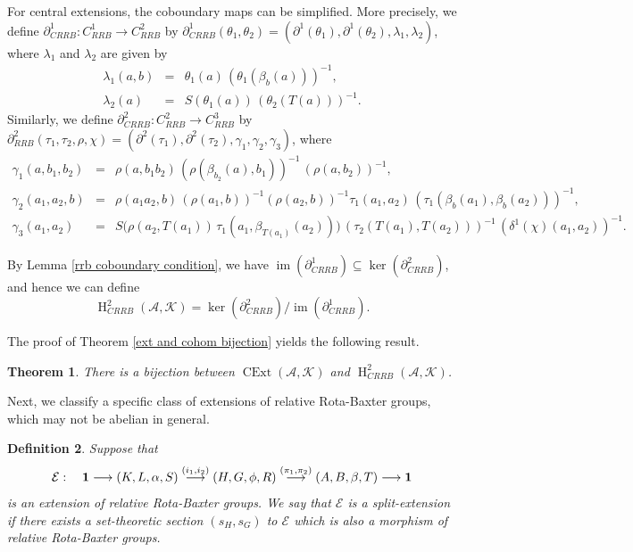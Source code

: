 \documentclass[11pt]{amsart}
\theoremstyle{thrm}
\theoremstyle{plain}
\newtheorem{thm}{Theorem}[section]
\newtheorem{defn}[thm]{Definition}
\theoremstyle{definition}
\newcommand{\Ho}{\operatorname{H} }
\newcommand{\CExt}{\operatorname{CExt} }
\newcommand{\Ker}{\operatorname{ker} }
\newcommand{\IM}{\operatorname{im} }
\numberwithin{equation}{section}
\begin{document}
For central extensions, the coboundary maps can be simplified. More precisely,  we define $\partial_{CRRB}^1: C^1_{RRB} \longrightarrow C^{2}_{RRB}$ by 
$\partial_{CRRB}^1(\theta_1, \theta_2)=(\partial^1(\theta_1), \partial^1(\theta_2), \lambda_1, \lambda_2  )$, where $\lambda_1$ and $\lambda_2$ are given by
\begin{eqnarray*}
\lambda_1(a,b) &=& \theta_1(a) \,(\theta_1(\beta_b(a)))^{-1},\\
\lambda_2(a)  &=& S(\theta_1(a)) \,(\theta_2(T(a)))^{-1}.
\end{eqnarray*}
Similarly, we define $\partial_{CRRB}^2: C^2_{RRB} \longrightarrow C^{3}_{RRB}$  by  $\partial^2_{RRB}(\tau_1, \tau_2, \rho, \chi)=(\partial^2(\tau_1), \partial^2(\tau_2), \gamma_1, \gamma_2, \gamma_3)$, where
\begin{eqnarray*}
\gamma_1(a,b_1, b_2) &=& \rho(a, b_1 b_2)  \,  (\rho(\beta_{b_2}(a), b_1))^{-1} \,(\rho(a,b_2))^{-1},\\
\gamma_2(a_1, a_2,b) &=& \rho(a_1 a_2, b) \,(\rho(a_1,b))^{-1}(\rho(a_2, b))^{-1} \tau_1(a_1, a_2) \, (\tau_1(\beta_{b}(a_1), \beta_{b}(a_2)))^{-1}, \\
\gamma_3(a_1, a_2) &=&  S\big(\rho(a_2, T(a_1)) \,\tau_1(a_1,\beta_{T(a_1)}(a_2)) \big) \, (\tau_2(T(a_1), T(a_2)))^{-1} \,(\delta^1(\chi)(a_1, a_2))^{-1}.
\end{eqnarray*}

By Lemma \ref{rrb coboundary condition}, we have $\IM(\partial^1_{CRRB}) \subseteq \ker(\partial^2_{CRRB})$, and hence we can  define  $$\Ho^2_{CRRB}(\mathcal{A}, \mathcal{K})=\Ker(\partial^2_{CRRB})/  \IM(\partial^1_{CRRB}).$$

The proof of Theorem \ref{ext and cohom bijection} yields the following result.

\begin{thm}
There is a bijection between $\CExt(\mathcal{A}, \mathcal{K})$ and $\Ho^2_{CRRB}(\mathcal{A}, \mathcal{K})$.
\end{thm}
\medskip


Next, we classify a specific class of extensions of relative Rota-Baxter groups, which may not be abelian in general.

\begin{defn}
Suppose that
$$\mathcal{E} : \quad {\bf 1} \longrightarrow (K,L, \alpha,S ) \stackrel{(i_1, i_2)}{\longrightarrow}  (H,G, \phi, R) \stackrel{(\pi_1, \pi_2)}{\longrightarrow} (A,B, \beta, T) \longrightarrow {\bf 1}$$ is an extension of relative Rota-Baxter groups. We say that $\mathcal{E}$ is a split-extension if there exists a set-theoretic section $(s_H, s_G)$ to  $\mathcal{E}$ which is also a morphism of relative Rota-Baxter groups.
\end{defn}
\end{document}
